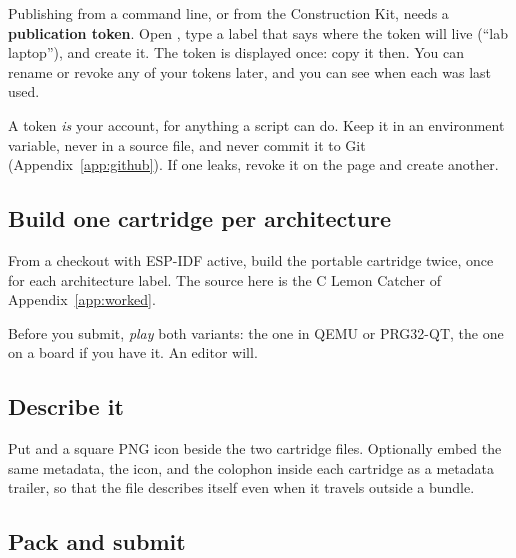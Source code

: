 Publishing from a command line, or from the Construction Kit, needs a
\textbf{publication token}. Open , type a label that says where
the token will live (``lab laptop''), and create it. The token is displayed
once: copy it then. You can rename or revoke any of your tokens later, and you
can see when each was last used.

\begin{prgwarn}
A token \emph{is} your account, for anything a script can do. Keep it in an
environment variable, never in a source file, and never commit it to Git
(Appendix~\ref{app:github}). If one leaks, revoke it on the  page
and create another.
\end{prgwarn}

\subsection{Build one cartridge per architecture}

From a \prg checkout with ESP-IDF active, build the portable cartridge twice,
once for each architecture label. The source here is the C Lemon Catcher of
Appendix~\ref{app:worked}.



Before you submit, \emph{play} both variants: the  one in QEMU or
PRG32-QT, the  one on a board if you have it. An editor will.

\subsection{Describe it}

Put  and a square PNG icon beside the two cartridge files.
Optionally embed the same metadata, the icon, and the colophon inside each
cartridge as a metadata trailer, so that the file describes itself even when it
travels outside a bundle.



\subsection{Pack and submit}



